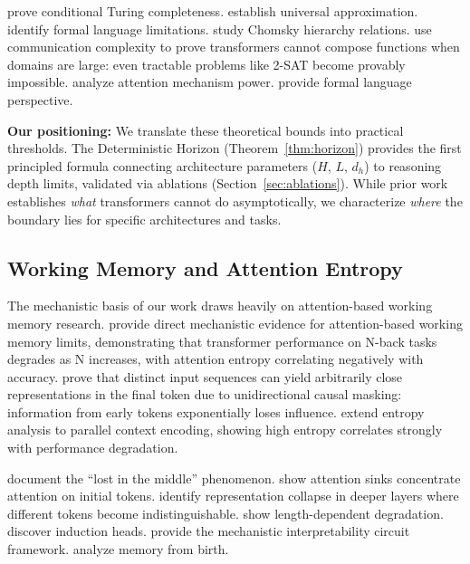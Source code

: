 \documentclass{article}
\theoremstyle{plain}
\theoremstyle{definition}
\theoremstyle{remark}
\begin{document}
\citet{perez2021turing} prove conditional Turing completeness. \citet{yun2020universal} establish universal approximation. \citet{hahn2020theoretical} identify formal language limitations. \citet{deletang2023chomsky} study Chomsky hierarchy relations. \citet{peng2024limitations} use communication complexity to prove transformers cannot compose functions when domains are large: even tractable problems like 2-SAT become provably impossible. \citet{bhattamishra2020computational} analyze attention mechanism power. \citet{strobl2024formal} provide formal language perspective.

\textbf{Our positioning:} We translate these theoretical bounds into practical thresholds. The Deterministic Horizon (Theorem~\ref{thm:horizon}) provides the first principled formula connecting architecture parameters ($H$, $L$, $d_h$) to reasoning depth limits, validated via ablations (Section~\ref{sec:ablations}). While prior work establishes \emph{what} transformers cannot do asymptotically, we characterize \emph{where} the boundary lies for specific architectures and tasks.

\subsection{Working Memory and Attention Entropy}

The mechanistic basis of our work draws heavily on attention-based working memory research. \citet{gong2024attention} provide direct mechanistic evidence for attention-based working memory limits, demonstrating that transformer performance on N-back tasks degrades as N increases, with attention entropy correlating negatively with accuracy. \citet{barbero2024oversquash} prove that distinct input sequences can yield arbitrarily close representations in the final token due to unidirectional causal masking: information from early tokens exponentially loses influence. \citet{zhang2024attention} extend entropy analysis to parallel context encoding, showing high entropy correlates strongly with performance degradation.

\citet{liu2023lost} document the ``lost in the middle'' phenomenon. \citet{xiao2024efficient} show attention sinks concentrate attention on initial tokens. \citet{gerasimov2025fullyutilizetransformersrepresentation} identify representation collapse in deeper layers where different tokens become indistinguishable. \citet{levy2024same} show length-dependent degradation. \citet{olsson2022context} discover induction heads. \citet{elhage2021mathematical} provide the mechanistic interpretability circuit framework. \citet{bietti2024birth} analyze memory from birth.
\end{document}
